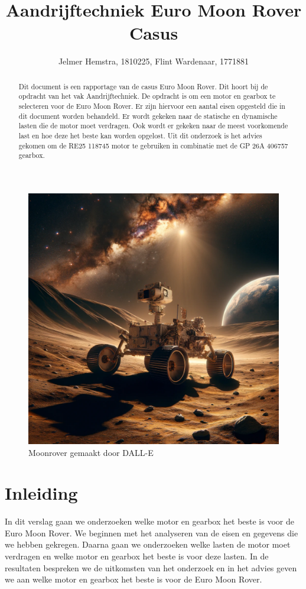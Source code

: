\documentclass{article}
\title{Aandrijftechniek Euro Moon Rover Casus}
\author{Jelmer Hemstra, 1810225, Flint Wardenaar, 1771881}
\begin{document}
\maketitle
\begin{figure}[h]
    \centering
    \includegraphics[width=1\textwidth]{Maanlanderfixed.png}
    \caption{Moonrover gemaakt door DALL-E}
    \label{fig:moonrover2}
\end{figure}
\newpage
\tableofcontents
\newpage
\begin{abstract}
    Dit document is een rapportage van de casus Euro Moon Rover. 
    Dit hoort bij de opdracht van het vak Aandrijftechniek.
    De opdracht is om een motor en gearbox te selecteren voor de Euro Moon Rover.
    Er zijn hiervoor een aantal eisen opgesteld die in dit document worden behandeld.
    Er wordt gekeken naar de statische en dynamische lasten die de motor moet verdragen.
    Ook wordt er gekeken naar de meest voorkomende last en hoe deze het beste kan worden opgelost.
    Uit dit onderzoek is het advies gekomen om de RE25 118745 motor te gebruiken in combinatie met de GP 26A 406757 gearbox.
\end{abstract}


\section{Inleiding}
    In dit verslag gaan we onderzoeken welke motor en gearbox het beste is voor de Euro Moon Rover.
    We beginnen met het analyseren van de eisen en gegevens die we hebben gekregen.
    Daarna gaan we onderzoeken welke lasten de motor moet verdragen en welke motor en gearbox het beste is voor deze lasten.
    In de resultaten bespreken we de uitkomsten van het onderzoek en in het advies geven we aan welke motor en gearbox het beste is voor de Euro Moon Rover.
\end{document}
